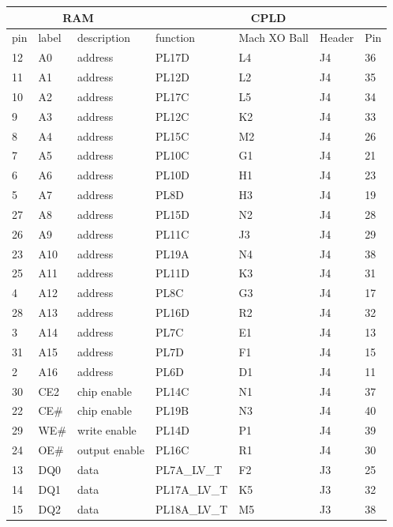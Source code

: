 \documentclass{article}
\begin{document}
\begin{table}
\center
\begin{tabular}{|l|l|l|l|l|l|l|}
	\hline
	\multicolumn{3}{|c|}{\textbf{RAM}} & \multicolumn{4}{|c|}{\textbf{CPLD}} \\
	\hline
	pin & label & description &  function & Mach XO Ball & Header & Pin \\
	\hline
	12 & A0 & address & PL17D & L4 & J4 & 36 \\
	\hline
	11 & A1 & address & PL12D & L2 & J4 & 35 \\
	\hline
	10 & A2 & address & PL17C & L5 & J4 & 34 \\
	\hline
	9 & A3 & address & PL12C & K2 & J4 & 33 \\
	\hline
	8 & A4 & address & PL15C & M2 & J4 & 26 \\
	\hline
	7 & A5 & address & PL10C & G1 & J4 & 21 \\
	\hline
	6 & A6 & address & PL10D & H1 & J4 & 23 \\
	\hline
	5 & A7 & address & PL8D & H3 & J4 & 19 \\
	\hline
	27 & A8 & address & PL15D & N2 & J4 & 28 \\
	\hline
	26 & A9 & address & PL11C & J3 & J4 & 29 \\
	\hline
	23 & A10 & address & PL19A & N4 & J4 & 38 \\
	\hline
	25 & A11 & address & PL11D & K3 & J4 & 31 \\
	\hline
	4 & A12 & address & PL8C & G3 & J4 & 17 \\
	\hline
	28 & A13 & address & PL16D & R2 & J4 & 32 \\
	\hline
	3 & A14 & address & PL7C & E1 & J4 & 13 \\
	\hline
	31 & A15 & address & PL7D & F1 & J4 & 15 \\
	\hline
	2 & A16 & address & PL6D & D1 & J4 & 11 \\
	\hline
	30 & CE2 & chip enable & PL14C & N1 & J4 & 37 \\
	\hline
	22 & CE\# & chip enable & PL19B & N3 & J4 & 40 \\
	\hline
	29 & WE\# & write enable & PL14D & P1 & J4 & 39 \\
	\hline
	24 & OE\# & output enable & PL16C & R1 & J4 & 30 \\
	\hline
	13 & DQ0 & data & PL7A\_LV\_T & F2 & J3 & 25 \\
	\hline
	14 & DQ1 & data & PL17A\_LV\_T & K5 & J3 & 32 \\
	\hline
	15 & DQ2 & data & PL18A\_LV\_T & M5 & J3 & 38 \\

\end{tabular}
\end{table}
\end{document}
